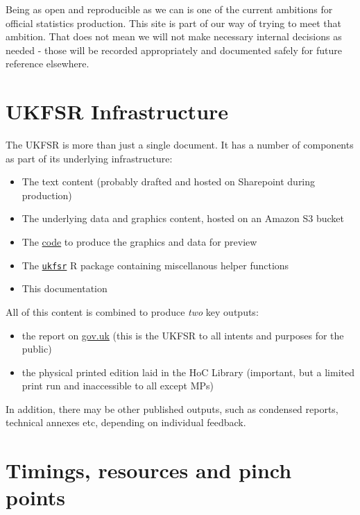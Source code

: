 \documentclass[
]{book}
\providecommand{\tightlist}{%
  \setlength{\itemsep}{0pt}\setlength{\parskip}{0pt}}
\begin{document}
Being as open and reproducible as we can is one of the current ambitions for
official statistics production. This site is part of our way of trying to meet
that ambition. That does not mean we will not make necessary internal decisions
as needed - those will be recorded appropriately and documented safely
for future reference elsewhere.

\hypertarget{ukfsr-infrastructure}{%
\section{UKFSR Infrastructure}\label{ukfsr-infrastructure}}

The UKFSR is more than just a single document. It has a number of components as
part of its underlying infrastructure:

\begin{itemize}
\tightlist
\item
  The text content (probably drafted and hosted on Sharepoint during production)
\item
  The underlying data and graphics content, hosted on an Amazon S3 bucket
\item
  The \href{https://github.com/Defra-Data-Science-Centre-of-Excellence/UKFSR2024}{code} to produce the graphics and data for preview
\item
  The \href{https://github.com/FoodchainStats/ukfsr}{\texttt{ukfsr}} R package containing miscellanous helper functions
\item
  This documentation
\end{itemize}

All of this content is combined to produce \emph{two} key outputs:

\begin{itemize}
\tightlist
\item
  the report on \href{https://www.gov.uk/government/collections/united-kingdom-food-security-report}{gov.uk} (this is the UKFSR to all intents and purposes for the public)
\item
  the physical printed edition laid in the HoC Library (important, but a limited print run and inaccessible to all except MPs)
\end{itemize}

In addition, there may be other published outputs, such as condensed reports,
technical annexes etc, depending on individual feedback.

\hypertarget{timings-resources-and-pinch-points}{%
\section{Timings, resources and pinch points}\label{timings-resources-and-pinch-points}}
\end{document}
